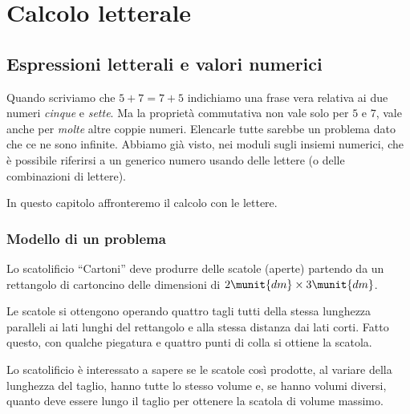 


\chapter{Calcolo letterale}


\section{Espressioni letterali e valori numerici}
\label{sec:calclett_esplett}

Quando scriviamo che \(5 +7 = 7 +5\) indichiamo una frase vera relativa 
ai due numeri \emph{cinque} e \emph{sette}.
Ma la proprietà commutativa non vale solo per \(5\) e \(7\), vale anche 
per \emph{molte} altre coppie numeri.
Elencarle tutte sarebbe un problema dato che ce ne sono infinite.
Abbiamo già visto, nei moduli sugli insiemi numerici, che è possibile 
riferirsi a un generico numero usando delle lettere 
(o delle combinazioni di lettere).

In questo capitolo affronteremo il calcolo con le lettere.

\subsection{Modello di un problema}
\label{subsec:calclett_modello}

\begin{problema}{}{}\label{cartoni}
Lo scatolificio ``Cartoni'' deve produrre delle scatole (aperte) partendo 
da un rettangolo di cartoncino delle dimensioni di 
\(2\munit{dm} \times 3\munit{dm}\).

Le scatole si ottengono operando quattro tagli tutti della stessa 
lunghezza paralleli ai lati lunghi del rettangolo e alla stessa distanza 
dai lati corti. 
Fatto questo, con qualche piegatura e quattro punti di colla si ottiene 
la scatola.

Lo scatolificio è interessato a sapere se le scatole così prodotte,
al variare della lunghezza del taglio, hanno tutte lo stesso volume e, 
se hanno volumi diversi, quanto deve essere lungo 
il taglio per ottenere la scatola di volume massimo. \\[.5em]
\scatola 
\end{problema}

